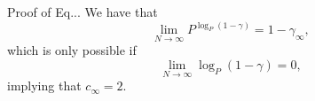 \documentclass[a4paper,10pt]{article}
\begin{document}
\begin{section}{Proof of Eq...}
We have that
\begin{equation}
\lim_{N\rightarrow\infty} P^{\log_{P}(1-\gamma)} = 1-\gamma_{\infty},
\end{equation}
which is only possible if 
\begin{equation}
\lim_{N\rightarrow\infty} \log_{P}(1-\gamma) = 0,
\end{equation}
implying that $c_{\infty} = 2$.

 
\end{section}
\end{document}
